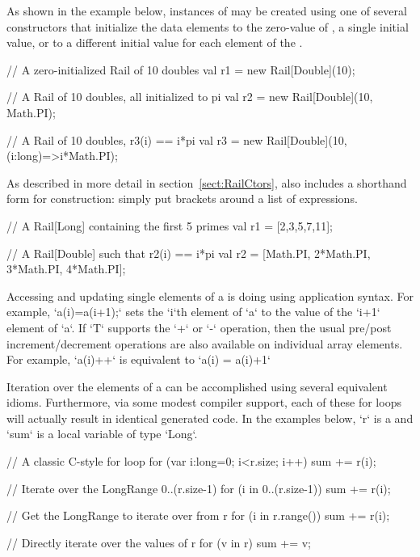 As shown in the example below, instances of  may be created
using one of several constructors that initialize the data elements to
the zero-value of , a single initial value, or to a different
initial value for each element of the .

\begin{xten}
// A zero-initialized Rail of 10 doubles
val r1 = new Rail[Double](10);

// A Rail of 10 doubles, all initialized to pi
val r2 = new Rail[Double](10, Math.PI);

// A Rail of 10 doubles, r3(i) == i*pi
val r3 = new Rail[Double](10, (i:long)=>i*Math.PI);
\end{xten}

As described in more detail in section~\ref{sect:RailCtors}, \Xten{} also includes a
shorthand form for  construction: simply put brackets around
a list of expressions.

\begin{xten}
// A Rail[Long] containing the first 5 primes
val r1 = [2,3,5,7,11];

// A Rail[Double] such that r2(i) == i*pi
val r2 = [Math.PI, 2*Math.PI, 3*Math.PI, 4*Math.PI];
\end{xten}

Accessing and updating single elements of a  is doing using
application syntax. For example,
\xcd`a(i)=a(i+1);`
sets the \xcd`i`th element of \xcd`a` to the value of the \xcd`i+1`
element of \xcd`a`.  If \xcd`T` supports the \xcd`+` or \xcd`-`
operation, then the usual pre/post increment/decrement operations are
also available on individual array elements.  For example, 
\xcd`a(i)++`
is equivalent to
\xcd`a(i) = a(i)+1`

Iteration over the elements of a  can be accomplished using
several equivalent idioms.  Furthermore, via some modest compiler
support, each of these for loops will actually result in identical
generated code.  In the examples below, \xcd`r` is a 
and \xcd`sum` is a local variable of type \xcd`Long`.
\begin{xten}
// A classic C-style for loop
for (var i:long=0; i<r.size; i++) {
    sum += r(i);
}

// Iterate over the LongRange 0..(r.size-1)
for (i in 0..(r.size-1)) {
    sum += r(i);
}

// Get the LongRange to iterate over from r
for (i in r.range()) {
    sum += r(i);
}

// Directly iterate over the values of r
for (v in r) {
    sum += v;
} 
\end{xten}

